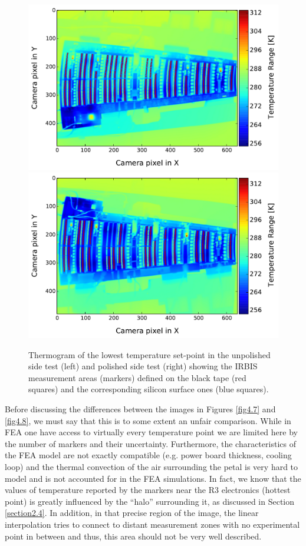 		\begin{figure}[ht!]
			\centering
			\captionsetup{justification=centering,margin=2cm}
			\includegraphics[scale=0.39]{Figures/Chapter04/thermo_Temp_20170803154926.pdf}
			\includegraphics[scale=0.39]{Figures/Chapter04/thermo_Temp_201708101118_avg.pdf}
			\caption{Thermogram of the lowest temperature set-point in the unpolished side test (left) and polished side test (right) showing the IRBIS measurement areas (markers) defined on the black tape (red squares) and the corresponding silicon surface ones (blue squares).}\label{fig4.6}
		\end{figure}
		
		Before discussing the differences between the images in Figures \ref{fig4.7} and \ref{fig4.8}, we must say that this is to some extent an unfair comparison. While in FEA one have access to virtually every temperature point we are limited here by the number of markers and their uncertainty. Furthermore, the characteristics of the FEA model are not exactly compatible (e.g. power board thickness, cooling loop) and the thermal convection of the air surrounding the petal is very hard to model and is not accounted for in the FEA simulations. In fact, we know that the values of temperature reported by the markers near the R3 electronics (hottest point) is greatly influenced by the “halo” surrounding it, as discussed in Section \ref{section2.4}. In addition, in that precise region of the image, the linear interpolation tries to connect to distant measurement zones with no experimental point in between and thus, this area should not be very well described.
		
